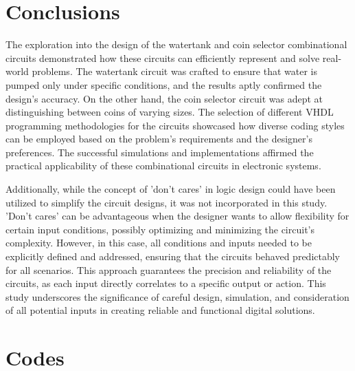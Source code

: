 \documentclass{article}
\begin{document}
\begin{multicols}{2}
	\section*{Conclusions}\label{Conclusions}
	The exploration into the design of the watertank and coin selector combinational circuits demonstrated how these circuits can efficiently represent and solve real-world problems. The watertank circuit was crafted to ensure that water is pumped only under specific conditions, and the results aptly confirmed the design's accuracy. On the other hand, the coin selector circuit was adept at distinguishing between coins of varying sizes. The selection of different VHDL programming methodologies for the circuits showcased how diverse coding styles can be employed based on the problem's requirements and the designer's preferences. The successful simulations and implementations affirmed the practical applicability of these combinational circuits in electronic systems.

	Additionally, while the concept of 'don't cares' in logic design could have been utilized to simplify the circuit designs, it was not incorporated in this study. 'Don't cares' can be advantageous when the designer wants to allow flexibility for certain input conditions, possibly optimizing and minimizing the circuit's complexity. However, in this case, all conditions and inputs needed to be explicitly defined and addressed, ensuring that the circuits behaved predictably for all scenarios. This approach guarantees the precision and reliability of the circuits, as each input directly correlates to a specific output or action. This study underscores the significance of careful design, simulation, and consideration of all potential inputs in creating reliable and functional digital solutions.

	\newpage
	\appendix

	\section{Codes}\label{Codes}

	

	

	

	


\end{multicols}
\end{document}
